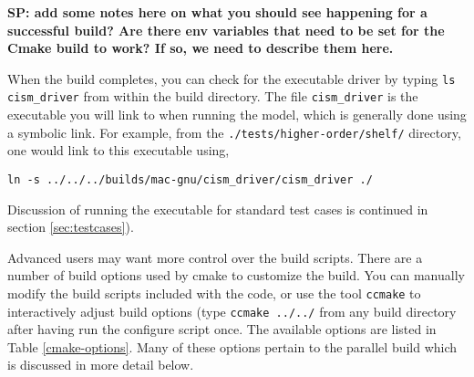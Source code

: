 \textbf{SP: add some notes here on what you should see happening for a successful build? Are there env variables that need to be set for the Cmake build to work? If so, we need to describe them here.}

When the build completes, you can check for the executable driver by typing \texttt{ls cism\_driver} from within the build directory. The file \texttt{cism\_driver} is the executable you will link to when running the model, which is generally done using a symbolic link. For example, from the \texttt{./tests/higher-order/shelf/} directory, one would link to this executable using, 

\begin{verbatim}
ln -s ../../../builds/mac-gnu/cism_driver/cism_driver ./
\end{verbatim}

Discussion of running the executable for standard test cases is continued in section \ref{sec:testcases}). 


Advanced users may want more control over the build scripts.  There are a number of
build options used by cmake to customize the build.  You can manually modify the 
build scripts included with the code, or use the tool \texttt{ccmake} to 
interactively adjust build options (type \texttt{ccmake ../../} from any build directory
after having run the configure script once.  The available options are listed in Table \ref{cmake-options}.
Many of these options pertain to the parallel build which is discussed in more detail below.



